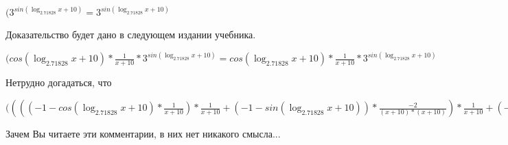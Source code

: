 \documentclass[12pt,a4paper,fleqn]{article}
\theoremstyle{definition}
\begin{document}
$({ 3 }^{sin(\log_{ 2.71828 }{ x  +  10 })} = { 3 }^{sin(\log_{ 2.71828 }{ x  +  10 })}$

Доказательство будет дано в следующем издании учебника.

$(cos(\log_{ 2.71828 }{ x  +  10 }) * \frac{ 1 }{ x  +  10 }
 * { 3 }^{sin(\log_{ 2.71828 }{ x  +  10 })} = cos(\log_{ 2.71828 }{ x  +  10 }) * \frac{ 1 }{ x  +  10 }
 * { 3 }^{sin(\log_{ 2.71828 }{ x  +  10 })}$

Нетрудно догадаться, что

$(((( -1  - cos(\log_{ 2.71828 }{ x  +  10 }) * \frac{ 1 }{ x  +  10 }
) * \frac{ 1 }{ x  +  10 }
 + ( -1  - sin(\log_{ 2.71828 }{ x  +  10 })) * \frac{ -2 }{( x  +  10 ) * ( x  +  10 )}
) * \frac{ 1 }{ x  +  10 }
 + ( -1  - sin(\log_{ 2.71828 }{ x  +  10 })) * \frac{ 1 }{ x  +  10 }
 * \frac{ -2 }{( x  +  10 ) * ( x  +  10 )}
 + ( -1  - sin(\log_{ 2.71828 }{ x  +  10 })) * \frac{ 1 }{ x  +  10 }
 * \frac{ -2 }{( x  +  10 ) * ( x  +  10 )}
 + cos(\log_{ 2.71828 }{ x  +  10 }) * \frac{ -1  -  -2  * ( x  +  10  +  x  +  10 )}{( x  +  10 ) * ( x  +  10 ) * ( x  +  10 ) * ( x  +  10 )}
) * cos(\log_{ 2.71828 }{ x  +  10 }) * \frac{ 1 }{ x  +  10 }
 * { 3 }^{sin(\log_{ 2.71828 }{ x  +  10 })} = ((( -1  - cos(\log_{ 2.71828 }{ x  +  10 }) * \frac{ 1 }{ x  +  10 }
) * \frac{ 1 }{ x  +  10 }
 + ( -1  - sin(\log_{ 2.71828 }{ x  +  10 })) * \frac{ -2 }{( x  +  10 ) * ( x  +  10 )}
) * \frac{ 1 }{ x  +  10 }
 + ( -1  - sin(\log_{ 2.71828 }{ x  +  10 })) * \frac{ 1 }{ x  +  10 }
 * \frac{ -2 }{( x  +  10 ) * ( x  +  10 )}
 + ( -1  - sin(\log_{ 2.71828 }{ x  +  10 })) * \frac{ 1 }{ x  +  10 }
 * \frac{ -2 }{( x  +  10 ) * ( x  +  10 )}
 + cos(\log_{ 2.71828 }{ x  +  10 }) * \frac{ -1  -  -2  * ( x  +  10  +  x  +  10 )}{( x  +  10 ) * ( x  +  10 ) * ( x  +  10 ) * ( x  +  10 )}
) * cos(\log_{ 2.71828 }{ x  +  10 }) * \frac{ 1 }{ x  +  10 }
 * { 3 }^{sin(\log_{ 2.71828 }{ x  +  10 })}$

Зачем Вы читаете эти комментарии, в них нет никакого смысла...
\end{document}
